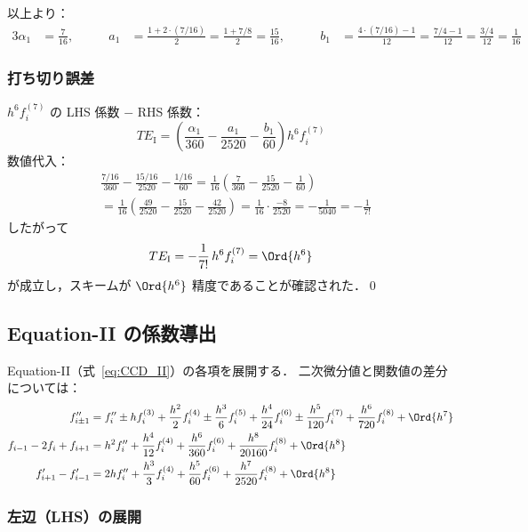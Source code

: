 以上より：
\begin{alignat}{3}
  \alpha_1 &= \frac{7}{16}, \qquad
  &a_1 &= \frac{1+2\cdot(7/16)}{2} = \frac{1 + 7/8}{2} = \frac{15}{16}, \qquad
  &b_1 &= \frac{4\cdot(7/16)-1}{12} = \frac{7/4-1}{12} = \frac{3/4}{12} = \frac{1}{16}
\end{alignat}

\subsubsection*{打ち切り誤差}

$h^6 f^{(7)}_i$ の LHS 係数 $-$ RHS 係数：
\[
  TE_{\mathrm{I}} = \left(\frac{\alpha_1}{360} - \frac{a_1}{2520} - \frac{b_1}{60}\right)h^6 f^{(7)}_i
\]
数値代入：
\begin{align*}
  &\frac{7/16}{360} - \frac{15/16}{2520} - \frac{1/16}{60}
  = \frac{1}{16}\!\left(\frac{7}{360} - \frac{15}{2520} - \frac{1}{60}\right) \\
  &= \frac{1}{16}\!\left(\frac{49}{2520} - \frac{15}{2520} - \frac{42}{2520}\right)
  = \frac{1}{16}\cdot\frac{-8}{2520}
  = -\frac{1}{5040} = -\frac{1}{7!}
\end{align*}
したがって
\[
  TE_{\mathrm{I}} = -\frac{1}{7!}\,h^6 f^{(7)}_i = \Ord{h^6}
\]
が成立し，スキームが $\Ord{h^6}$ 精度であることが確認された．\qed

\subsection{Equation-II の係数導出}
\label{app:ccd_coef_derivation_II}

Equation-II（式~\eqref{eq:CCD_II}）の各項を展開する．
二次微分値と関数値の差分については：
\begin{align}
  f''_{i\pm1} &= f''_i \pm hf^{(3)}_i + \frac{h^2}{2}f^{(4)}_i \pm \frac{h^3}{6}f^{(5)}_i
                + \frac{h^4}{24}f^{(6)}_i \pm \frac{h^5}{120}f^{(7)}_i
                + \frac{h^6}{720}f^{(8)}_i + \Ord{h^7} \\
  f_{i-1} - 2f_i + f_{i+1} &= h^2 f''_i + \frac{h^4}{12}f^{(4)}_i
                               + \frac{h^6}{360}f^{(6)}_i
                               + \frac{h^8}{20160}f^{(8)}_i + \Ord{h^8} \\
  f'_{i+1} - f'_{i-1} &= 2hf''_i + \frac{h^3}{3}f^{(4)}_i
                         + \frac{h^5}{60}f^{(6)}_i
                         + \frac{h^7}{2520}f^{(8)}_i + \Ord{h^8}
\end{align}

\subsubsection*{左辺（LHS）の展開}

